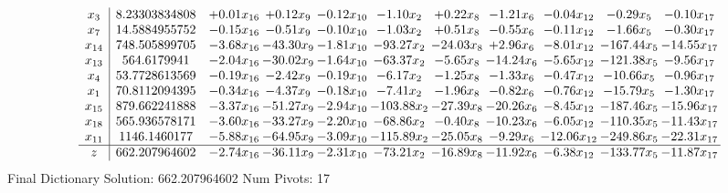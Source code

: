 \documentclass[9pt]{article}
\begin{document}
 \[\begin{array}{c| c c@{\hskip 2pt} c@{\hskip 2pt} c@{\hskip 2pt} c@{\hskip 2pt} c@{\hskip 2pt} c@{\hskip 2pt} c@{\hskip 2pt} c@{\hskip 2pt} c@{\hskip 2pt} }
 x_{3}   &  8.23303834808 & +  0.01 x_{16} & +  0.12 x_{9} & -0.12 x_{10} & -1.10 x_{2} & +  0.22 x_{8} & -1.21 x_{6} & -0.04 x_{12} & -0.29 x_{5} & -0.10 x_{17}\\
 x_{7}   &  14.5884955752 & -0.15 x_{16} & -0.51 x_{9} & -0.10 x_{10} & -1.03 x_{2} & +  0.51 x_{8} & -0.55 x_{6} & -0.11 x_{12} & -1.66 x_{5} & -0.30 x_{17}\\
 x_{14}   &  748.505899705 & -3.68 x_{16} & -43.30 x_{9} & -1.81 x_{10} & -93.27 x_{2} & -24.03 x_{8} & +  2.96 x_{6} & -8.01 x_{12} & -167.44 x_{5} & -14.55 x_{17}\\
 x_{13}   &  564.6179941 & -2.04 x_{16} & -30.02 x_{9} & -1.64 x_{10} & -63.37 x_{2} & -5.65 x_{8} & -14.24 x_{6} & -5.65 x_{12} & -121.38 x_{5} & -9.56 x_{17}\\
 x_{4}   &  53.7728613569 & -0.19 x_{16} & -2.42 x_{9} & -0.19 x_{10} & -6.17 x_{2} & -1.25 x_{8} & -1.33 x_{6} & -0.47 x_{12} & -10.66 x_{5} & -0.96 x_{17}\\
 x_{1}   &  70.8112094395 & -0.34 x_{16} & -4.37 x_{9} & -0.18 x_{10} & -7.41 x_{2} & -1.96 x_{8} & -0.82 x_{6} & -0.76 x_{12} & -15.79 x_{5} & -1.30 x_{17}\\
 x_{15}   &  879.662241888 & -3.37 x_{16} & -51.27 x_{9} & -2.94 x_{10} & -103.88 x_{2} & -27.39 x_{8} & -20.26 x_{6} & -8.45 x_{12} & -187.46 x_{5} & -15.96 x_{17}\\
 x_{18}   &  565.936578171 & -3.60 x_{16} & -33.27 x_{9} & -2.20 x_{10} & -68.86 x_{2} & -0.40 x_{8} & -10.23 x_{6} & -6.05 x_{12} & -110.35 x_{5} & -11.43 x_{17}\\
 x_{11}   &  1146.1460177 & -5.88 x_{16} & -64.95 x_{9} & -3.09 x_{10} & -115.89 x_{2} & -25.05 x_{8} & -9.29 x_{6} & -12.06 x_{12} & -249.86 x_{5} & -22.31 x_{17}\\
\hline
z    &  662.207964602 & -2.74 x_{16} & -36.11 x_{9} & -2.31 x_{10} & -73.21 x_{2} & -16.89 x_{8} & -11.92 x_{6} & -6.38 x_{12} & -133.77 x_{5} & -11.87 x_{17}\\
\end{array}\]
Final Dictionary
Solution:  662.207964602
Num Pivots:  17
\end{document}
